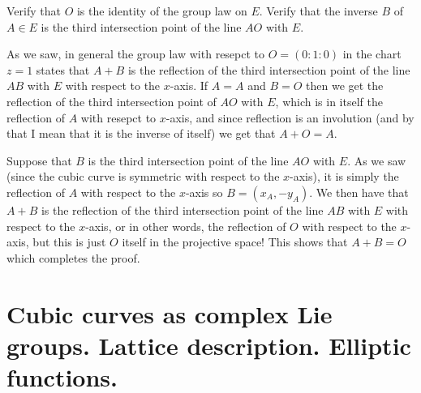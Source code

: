 \documentclass[11pt, a4paper]{article}
\begin{document}
\begin{exercise}
  Verify that $O$ is the identity of the group law on $E$.
  Verify that the inverse $B$ of $A \in E$
  is the third intersection point of the line $AO$ with $E$.
\end{exercise}
\begin{solution}
  As we saw, in general the group law with resepct to $O = (0 : 1 : 0)$
  in the chart $z = 1$ states that $A+B$ is the reflection
  of the third intersection point of the line $AB$ with $E$ with respect to the $x$-axis.
  If $A = A$ and $B = O$ then we get the reflection of the third intersection
  point of $AO$ with $E$, which is in itself the reflection of $A$ with resepct
  to $x$-axis, and since reflection is an involution
  (and by that I mean that it is the inverse of itself) we get that $A + O = A$.

  Suppose that $B$ is the third intersection point of the line $AO$ with $E$.
  As we saw (since the cubic curve is symmetric with respect to the $x$-axis),
  it is simply the reflection of $A$ with respect to the $x$-axis so
  $B = (x_A,-y_A)$.
  We then have that $A + B$ is the reflection of the third intersection point
  of the line $AB$ with $E$ with respect to the $x$-axis,
  or in other words, the reflection of $O$ with respect to the $x$-axis,
  but this is just $O$ itself in the projective space!
  This shows that $A + B = O$ which completes the proof.
\end{solution}

\newpage

\section{Cubic curves as complex Lie groups. Lattice description. Elliptic functions.}
\end{document}
